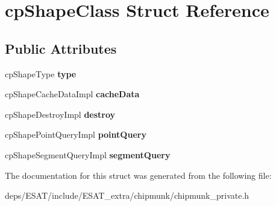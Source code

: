 \hypertarget{structcp_shape_class}{}\section{cp\+Shape\+Class Struct Reference}
\label{structcp_shape_class}
\subsection*{Public Attributes}
\begin{DoxyCompactItemize}
\item 
\mbox{\label{structcp_shape_class_a9715799d3a01fbd59636ddff5c8db804}} 
cp\+Shape\+Type {\bfseries type}
\item 
\mbox{\label{structcp_shape_class_a706a7db5c2ea333f48d95c873429c516}} 
cp\+Shape\+Cache\+Data\+Impl {\bfseries cache\+Data}
\item 
\mbox{\label{structcp_shape_class_a8b4a3c49681c00bba3eb47dff352d833}} 
cp\+Shape\+Destroy\+Impl {\bfseries destroy}
\item 
\mbox{\label{structcp_shape_class_ae24887377912c675605975d18849de79}} 
cp\+Shape\+Point\+Query\+Impl {\bfseries point\+Query}
\item 
\mbox{\label{structcp_shape_class_ac20debbb5fbd07165d38185e7f4c8989}} 
cp\+Shape\+Segment\+Query\+Impl {\bfseries segment\+Query}
\end{DoxyCompactItemize}


The documentation for this struct was generated from the following file\+:\begin{DoxyCompactItemize}
\item 
deps/\+E\+S\+A\+T/include/\+E\+S\+A\+T\+\_\+extra/chipmunk/chipmunk\+\_\+private.\+h\end{DoxyCompactItemize}
